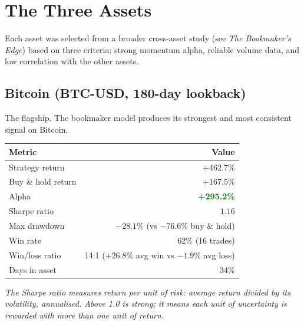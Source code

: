\documentclass[11pt,a4paper]{article}
\begin{document}

\section{The Three Assets}

Each asset was selected from a broader cross-asset study (see
\textit{The Bookmaker's Edge}) based on three criteria: strong
momentum alpha, reliable volume data, and low correlation with
the other assets.

\subsection{Bitcoin (BTC-USD, 180-day lookback)}

The flagship. The bookmaker model produces its strongest and most
consistent signal on Bitcoin.

\vspace{0.5em}
\begin{tabular}{@{}lr@{}}
    \toprule
    \textbf{Metric} & \textbf{Value} \\
    \midrule
    Strategy return    & $+462.7\%$ \\
    Buy \& hold return & $+167.5\%$ \\
    Alpha              & \textcolor{green}{\textbf{+295.2\%}} \\
    Sharpe ratio       & $1.16$ \\
    Max drawdown       & $-28.1\%$ (vs $-76.6\%$ buy \& hold) \\
    Win rate           & 62\% (16 trades) \\
    Win/loss ratio     & 14:1 ($+26.8\%$ avg win vs $-1.9\%$ avg loss) \\
    Days in asset      & 34\% \\
    \bottomrule
\end{tabular}

\vspace{0.5em}
\begin{tcolorbox}[colback=blue!5, colframe=blue!40, boxrule=0.5pt, arc=3pt,
    left=6pt, right=6pt, top=4pt, bottom=4pt]
{\small\textit{The Sharpe ratio measures return per unit of risk:
average return divided by its volatility, annualised.
Above 1.0 is strong; it means each unit of uncertainty
is rewarded with more than one unit of return.}}
\end{tcolorbox}
\end{document}
